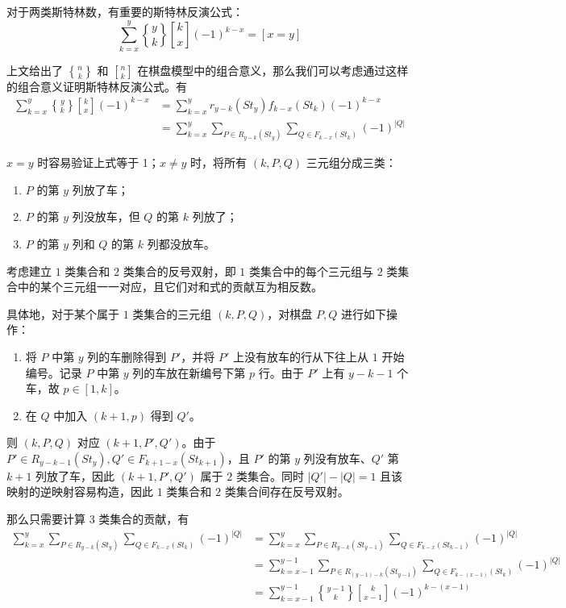 \documentclass{noithesis}
\begin{document}
	对于两类斯特林数，有重要的斯特林反演公式：\begin{equation}
	\sum_{k=x}^y {y \brace k} {k \brack x}(-1)^{k-x} = [x=y]
	\end{equation}
	
	上文给出了 $n \brace k$ 和 $n \brack k$ 在棋盘模型中的组合意义，那么我们可以考虑通过这样的组合意义证明斯特林反演公式。有\begin{equation}
	\begin{split}
	\sum_{k=x}^y {y \brace k} {k \brack x}(-1)^{k-x} &= \sum_{k=x}^y r_{y-k}(St_y) f_{k-x}(St_k)(-1)^{k-x} \\ &= \sum_{k=x}^y \sum_{P \in R_{y-k}(St_y)} \sum_{Q \in F_{k-x}(St_k)}(-1)^{|Q|}
	\end{split}
	\end{equation}
	
	$x=y$ 时容易验证上式等于 1；$x \neq y$ 时，将所有 $(k,P,Q)$ 三元组分成三类：
	\begin{enumerate}
		\item $P$ 的第 $y$ 列放了车；
		\item $P$ 的第 $y$ 列没放车，但 $Q$ 的第 $k$ 列放了；
		\item $P$ 的第 $y$ 列和 $Q$ 的第 $k$ 列都没放车。
	\end{enumerate}
	
	考虑建立 $1$ 类集合和 $2$ 类集合的反号双射，即 $1$ 类集合中的每个三元组与 $2$ 类集合中的某个三元组一一对应，且它们对和式的贡献互为相反数。
	
	具体地，对于某个属于 $1$ 类集合的三元组 $(k,P,Q)$，对棋盘 $P,Q$ 进行如下操作：
	\begin{enumerate}
		\item 将 $P$ 中第 $y$ 列的车删除得到 $P'$，并将 $P'$ 上没有放车的行从下往上从 $1$ 开始编号。记录 $P$ 中第 $y$ 列的车放在新编号下第 $p$ 行。由于 $P'$ 上有 $y-k-1$ 个车，故 $p \in [1,k]$。
		\item 在 $Q$ 中加入 $(k+1,p)$ 得到 $Q'$。
	\end{enumerate}
	则 $(k,P,Q)$ 对应 $(k+1,P',Q')$。由于 $P' \in R_{y-k-1}(St_y),Q' \in F_{k+1-x}(St_{k+1})$，且 $P'$ 的第 $y$ 列没有放车、$Q'$ 第 $k+1$ 列放了车，因此 $(k+1,P',Q')$ 属于 $2$ 类集合。同时 $|Q'| - |Q| = 1$ 且该映射的逆映射容易构造，因此 $1$ 类集合和 $2$ 类集合间存在反号双射。
	
	那么只需要计算 $3$ 类集合的贡献，有 \begin{equation}
	\begin{split}
	\sum_{k=x}^y \sum_{P \in R_{y-k}(St_y)} \sum_{Q \in F_{k-x}(St_k)}(-1)^{|Q|} &= \sum_{k=x}^y \sum_{P \in R_{y-k}(St_{y-1})} \sum_{Q \in F_{k-x}(St_{k-1})}(-1)^{|Q|} \\ &= \sum_{k=x-1}^{y-1} \sum_{P \in R_{(y-1)-k}(St_{y-1})} \sum_{Q \in F_{k-(x-1)}(St_k)}(-1)^{|Q|} \\ &= \sum_{k=x-1}^{y-1} {y-1 \brace k} {k \brack x-1}(-1)^{k-(x-1)}
	\end{split}
	\end{equation}
	
\end{document}
